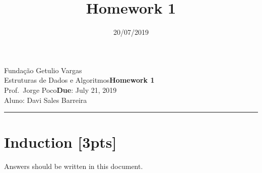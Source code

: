 \documentclass{article}
\title{Homework 1}
\date{20/07/2019}
\newcommand{\assignment}{Homework 1}
\newcommand{\duedate}{July 21, 2019}
\begin{document}
Fundação Getulio Vargas\hfill\\
Estruturas de Dados e Algoritmos\hfill\textbf{\assignment}\\
Prof.\ Jorge Poco\hfill\textbf{Due}: \duedate\\
Aluno: Davi Sales Barreira
\smallskip\hrule\bigskip

{\let\newpage\relax\maketitle}
\maketitle


\section{Induction [3pts]}
Answers should be written in this document. 
\end{document}
